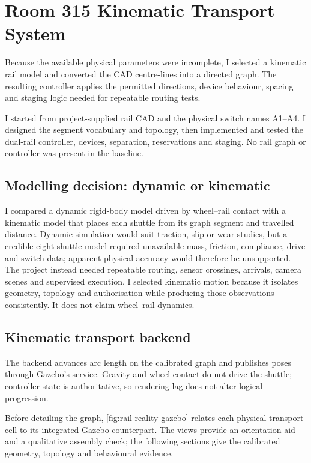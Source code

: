 \chapter{Room 315 Kinematic Transport System}
\label{chap:transport}

Because the available physical parameters were incomplete, I selected a
kinematic rail model and converted the CAD centre-lines into a directed graph.
The resulting controller applies the permitted directions, device behaviour,
spacing and staging logic needed for repeatable routing tests.

I started from project-supplied rail CAD and the physical switch names A1--A4.
I designed the segment vocabulary and topology, then implemented and tested the
dual-rail controller, devices, separation, reservations and staging. No rail
graph or controller was present in the baseline.

\section{Modelling decision: dynamic or kinematic}

I compared a dynamic rigid-body model driven by wheel--rail contact with a
kinematic model that places each shuttle from its graph segment and travelled
distance. Dynamic simulation would suit traction, slip or wear studies, but a
credible eight-shuttle model required unavailable mass, friction, compliance,
drive and switch data; apparent physical accuracy would therefore be
unsupported. The project instead needed repeatable routing, sensor crossings,
arrivals, camera scenes and supervised execution. I selected kinematic motion
because it isolates geometry, topology and authorisation while producing those
observations consistently. It does not claim wheel--rail dynamics.

\section{Kinematic transport backend}

The backend advances arc length on the calibrated graph and publishes poses
through Gazebo's  service. Gravity and wheel contact do not drive
the shuttle; controller state is authoritative, so rendering lag does not alter
logical progression.

Before detailing the graph, \cref{fig:rail-reality-gazebo} relates each physical
transport cell to its integrated Gazebo counterpart. The views provide an
orientation aid and a qualitative assembly check; the following sections give
the calibrated geometry, topology and behavioural evidence.

